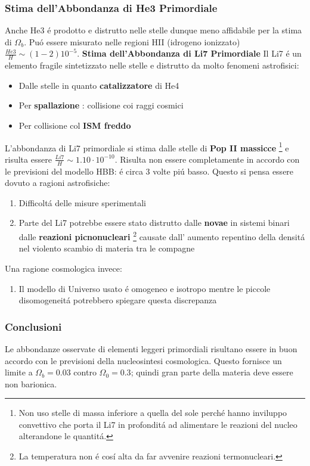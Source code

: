\documentclass[12pt, a4paper]{article}
\begin{document}
\subsubsection{Stima dell'Abbondanza di He3 Primordiale}
Anche He3 \'{e} prodotto e distrutto nelle stelle dunque meno affidabile per la stima di $\Omega_b$. Pu\'{o} essere misurato nelle regioni HII (idrogeno ionizzato) $\frac{He3}{H}\sim (1-2)10^{-5}$.
\textbf{Stima dell'Abbondanza di Li7 Primordiale}
Il Li7 \'{e} un elemento fragile sintetizzato nelle stelle e distrutto da molto fenomeni astrofisici:
\begin{itemize}
\item Dalle stelle in quanto \textbf{catalizzatore} di He4
\item Per \textbf{spallazione} : collisione coi raggi cosmici
\item Per collisione col \textbf{ISM freddo}
\end{itemize}
L'abbondanza di Li7 primordiale si stima dalle stelle di \textbf{Pop II massicce} \footnote{Non uso stelle di massa inferiore a quella del sole perch\'{e} hanno inviluppo convettivo che porta il Li7 in profondit\'{a} ad alimentare le reazioni del nucleo alterandone le quantit\'{a}.} e risulta essere $\frac{Li7}{H}\sim 1.10 \cdot 10^{-10}$. Risulta non essere completamente in accordo con le previsioni del modello HBB: \'{e} circa 3 volte pi\'{u} basso. Questo si pensa essere dovuto a ragioni astrofisiche:
\begin{enumerate}
\item Difficolt\'{a} delle misure sperimentali
\item Parte del Li7 potrebbe essere stato distrutto dalle \textbf{novae} in sistemi binari dalle \textbf{reazioni picnonucleari} \footnote{La temperatura non \'{e} cos\'{i} alta da far avvenire reazioni termonucleari.} causate dall' aumento repentino della densit\'{a} nel violento scambio di materia tra le compagne
\end{enumerate}
Una ragione cosmologica invece:
\begin{enumerate}
\item Il modello di Universo usato \'{e} omogeneo e isotropo mentre le piccole disomogeneit\'{a} potrebbero spiegare questa discrepanza
\end{enumerate}
\subsubsection{Conclusioni}
Le abbondanze osservate di elementi leggeri primordiali risultano essere in buon accordo con le previsioni della nucleosintesi cosmologica. Questo fornisce un limite a $\Omega_b=0.03$ contro  $\Omega_0=0.3$; quindi gran parte della materia deve essere non barionica.
\end{document}
